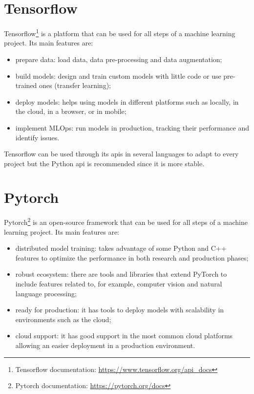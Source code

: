 \section{Tensorflow}

Tensorflow\footnote{Tensorflow documentation: \url{https://www.tensorflow.org/api_docs}} is a platform that can be used for all steps of a machine learning project. Its main features are:
\begin{itemize}
    \item prepare data: load data, data pre-processing and data augmentation;
    \item build models: design and train custom models with little code or use pre-trained ones (transfer learning);
    \item deploy models: helps using models in different platforms such as locally, in the cloud, in a browser, or in mobile;
    \item implement MLOps: run models in production, tracking their performance and identify issues.
\end{itemize}

Tensorflow can be used through its \acp{api} in several languages to adapt to every project but the Python \acs{api} is recommended since it is more stable.

\section{Pytorch}

Pytorch\footnote{Pytorch documentation: \url{https://pytorch.org/docs}} is an open-source framework that can be used for all steps of a machine learning project. Its main features are:

\begin{itemize}
    \item distributed model training: takes advantage of some Python and C++ features to optimize the performance in both research and production phases;
    \item robust ecosystem: there are tools and libraries that extend PyTorch to include features related to, for example, computer vision and natural language processing;
    \item ready for production: it has tools to deploy models with scalability in environments such as the cloud;
    \item cloud support: it has good support in the most common cloud platforms allowing an easier deployment in a production environment.
\end{itemize}

